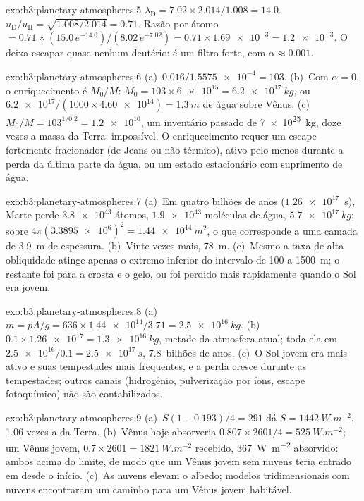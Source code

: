 \begin{solution}{exo:b3:planetary-atmospheres:5}
$\lambda_\mathrm D = 7.02\times2.014/1.008 = 14.0$. $u_\mathrm D/u_\mathrm H
= \sqrt{1.008/2.014} = 0.71$. Razão por átomo $= 0.71\times(15.0\,
e^{-14.0})/(8.02\,e^{-7.02}) = 0.71\times\num{1.69e-3} = \num{1.2e-3}$.
O  deixa escapar quase nenhum deutério: é um filtro forte, com
$\alpha \approx 0.001$.
\end{solution}

\begin{solution}{exo:b3:planetary-atmospheres:6}
(a)~$0.016/\num{1.5575e-4} = 103$. (b)~Com $\alpha = 0$, o enriquecimento é
$M_0/M$: $M_0 = 103\times\num{6e15} = \qty{6.2e17}{kg}$, ou
$\num{6.2e17}/(1000\times\num{4.60e14}) = \qty{1.3}{m}$ de água sobre
Vênus. (c)~$M_0/M = 103^{1/0.2} = \num{1.2e10}$, um inventário passado de
\qty{7e25}{kg}, doze vezes a massa da Terra: impossível. O
enriquecimento requer um escape fortemente fracionador (de Jeans ou não térmico),
ativo pelo menos durante a perda da última parte da água, ou um
estado estacionário com suprimento de água.
\end{solution}

\begin{solution}{exo:b3:planetary-atmospheres:7}
(a)~Em quatro bilhões de anos ($\num{1.26e17}$~s), Marte perde
$\num{3.8e43}$ átomos, $\num{1.9e43}$ moléculas de água, $\qty{5.7e17}{kg}$;
sobre $4\pi(\num{3.3895e6})^2 = \qty{1.44e14}{m^2}$, o que corresponde a uma camada
de \qty{3.9}{m} de espessura. (b)~Vinte vezes mais, \qty{78}{m}. (c)~Mesmo a
taxa de alta obliquidade atinge apenas o extremo inferior do intervalo de 100 a
\qty{1500}{m}; o restante foi para a crosta e o gelo, ou foi perdido
mais rapidamente quando o Sol era jovem.
\end{solution}

\begin{solution}{exo:b3:planetary-atmospheres:8}
(a)~$m = pA/g = 636\times\num{1.44e14}/3.71 = \qty{2.5e16}{kg}$.
(b)~$0.1\times\num{1.26e17} = \qty{1.3e16}{kg}$, metade da
atmosfera atual; toda ela em $\num{2.5e16}/0.1 = \qty{2.5e17}{s}$,
\num{7.8}~bilhões de anos. (c)~O Sol jovem era mais ativo e suas
tempestades mais frequentes, e a perda cresce durante as tempestades; outros canais
(hidrogênio, pulverização por íons, escape fotoquímico) não são contabilizados.
\end{solution}

\begin{solution}{exo:b3:planetary-atmospheres:9}
(a)~$S(1 - 0.193)/4 = 291$ dá $S = \qty{1442}{W.m^{-2}}$, 1.06 vezes
a da Terra. (b)~Vênus hoje absorveria $0.807\times2601/4 =
\qty{525}{W.m^{-2}}$; um Vênus jovem, $0.7\times2601 = \qty{1821}{W.m^{-2}}$
recebido, \qty{367}{W.m^{-2}} absorvido: ambos acima do limite, de modo que um
Vênus jovem sem nuvens teria entrado em  desde o início. (c)~As nuvens
elevam o albedo; modelos tridimensionais com nuvens encontraram um caminho
para um Vênus jovem habitável.
\end{solution}


